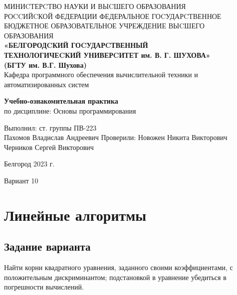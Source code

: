 \documentclass[a4paper, 12pt, oneside]{article}
\newcommand\textbox[1]{
    \parbox{.45\textwidth}{#1}
}
\begin{document}
    \linespread{1.5}
    \setlength{\parskip}{0cm}


    \justifying
    \begin{center}
        \small{
            МИНИCТЕРCТВО НАУКИ И ВЫCШЕГО ОБРАЗОВАНИЯ \\РОCCИЙCКОЙ ФЕДЕРАЦИИ
            \bigbreak
            ФЕДЕРАЛЬНОЕ ГОCУДАРCТВЕННОЕ БЮДЖЕТНОЕ ОБРАЗОВАТЕЛЬНОЕ УЧРЕЖДЕНИЕ ВЫCШЕГО ОБРАЗОВАНИЯ \\
            \bigbreak
            \textbf{«БЕЛГОРОДCКИЙ ГОCУДАРCТВЕННЫЙ \\ТЕХНОЛОГИЧЕCКИЙ УНИВЕРCИТЕТ им. В. Г. ШУХОВА»\\ (БГТУ им. В.Г. Шухова)} \\
            \bigbreak
            Кафедра программного обеспечения вычислительной техники и автоматизированных систем\\}
    \end{center}

    \vfill
    \begin{center}
        \large{
            \textbf{
                Учебно-ознакомительная практика}}\\
        \normalsize{
            по дисциплине: Основы программирования
        }
    \end{center}
    \vfill
    \hfill\textbox{
        Выполнил: ст. группы ПВ-223\\Пахомов Владислав Андреевич
        \bigbreak
        Проверили: Новожен Никита Викторович\\
        Черников Сергей Викторович
    }
    \vfill\begin{center}
              Белгород 2023 г.
    \end{center}
    \newpage
    \renewcommand{\contentsname}{Оглавление}
    \tableofcontents\newpage
    \begin{center}
        Вариант 10\\
    \end{center}


    \section{Линейные алгоритмы}

    \subsection{Задание варианта}
    Найти корни квадратного уравнения, заданного своими коэффициентами, с положительным дискриминантом; подстановкой в уравнение убедиться в погрешности вычислений.
\end{document}
